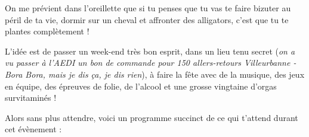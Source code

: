 On me prévient dans l'oreillette que si tu penses que tu vas te faire bizuter au
péril de ta vie, dormir sur un cheval et affronter des alligators, c'est que tu
te plantes complètement !

\vspace{1em}

L'idée est de passer un week-end très bon esprit, dans un lieu tenu secret
(\emph{on a
vu passer à l'AEDI un bon de commande pour 150 allers-retours
Villeurbanne - Bora Bora, mais je dis ça, je dis rien}), à faire la fête 
avec de la musique, des jeux en équipe, des épreuves de folie, de
l'alcool et une grosse vingtaine d'orgas survitaminés !

\vspace{1em}

Alors sans plus attendre, voici un programme succinct de ce qui t'attend durant
cet évènement :
